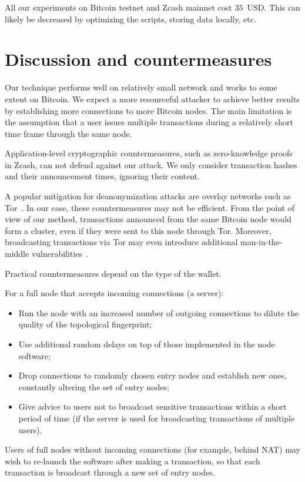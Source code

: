 All our experiments on Bitcoin testnet and Zcash mainnet cost $35$~USD\@.
This can likely be decreased by optimizing the scripts, storing data locally, etc.


\section{Discussion and countermeasures}

Our technique performs well on relatively small network and works to some extent on Bitcoin.
We expect a more resourceful attacker to achieve better results by establishing more connections to more Bitcoin nodes.
The main limitation is the assumption that a user issues multiple transactions during a relatively short time frame through the same node.

Application-level cryptographic countermeasures, such as zero-knowledge proofs in Zcash, can not defend against our attack.
We only consider transaction hashes and their announcement times, ignoring their content.

A popular mitigation for deanonymization attacks are overlay networks such as Tor~\cite{Tor}.
In our case, these countermeasures may not be efficient.
From the point of view of our method, transactions announced from the same Bitcoin node would form a cluster, even if they were sent to this node through Tor.
Moreover, broadcasting transactions via Tor may even introduce additional man-in-the-middle vulnerabilities~\cite{Biryukov2015}.

Practical countermeasures depend on the type of the wallet.

For a full node that accepts incoming connections (a server):

\begin{itemize}
	\item Run the node with an increased number of outgoing connections to dilute the quality of the topological fingerprint;
	\item Use additional random delays on top of those implemented in the node software;
	\item Drop connections to randomly chosen entry nodes and establish new ones, constantly altering the set of entry nodes;
	\item Give advice to users not to broadcast sensitive transactions within a short period of time (if the server is used for broadcasting transactions of multiple users).
\end{itemize}

Users of full nodes without incoming connections (for example, behind NAT) may wish to re-launch the software after making a transaction, so that each transaction is broadcast through a new set of entry nodes.

